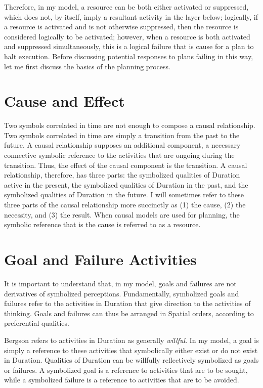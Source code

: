 Therefore, in my model, a resource can be both either activated or
suppressed, which does not, by itself, imply a resultant activity in
the layer below; logically, if a resource is activated and is not
otherwise suppressed, then the resource is considered logically to be
activated; however, when a resource is both activated and suppressed
simultaneously, this is a logical failure that is cause for a plan to
halt execution.  Before discussing potential responses to plans
failing in this way, let me first discuss the basics of the planning
process.

\section{Cause and Effect}

Two symbols correlated in time are not enough to compose a causal
relationship.  Two symbols correlated in time are simply a transition
from the past to the future.  A causal relationship supposes an
additional component, a necessary connective symbolic reference to the
activities that are ongoing during the transition.  Thus, the effect
of the causal component is the transition.  A causal relationship,
therefore, has three parts: the symbolized qualities of Duration
active in the present, the symbolized qualities of Duration in the
past, and the symbolized qualities of Duration in the future.  I will
sometimes refer to these three parts of the causal relationship more
succinctly as (1) the cause, (2) the necessity, and (3) the result.
When causal models are used for planning, the symbolic reference that
is the cause is referred to as a resource.

\section{Goal and Failure Activities}

It is important to understand that, in my model, goals and failures
are not derivatives of symbolized perceptions.  Fundamentally,
symbolized goals and failures refer to the activities in Duration that
give direction to the activities of thinking.  Goals and failures can
thus be arranged in Spatial orders, according to preferential
qualities.

Bergson refers to activities in Duration as generally \emph{willful}.
In my model, a goal is simply a reference to these activities that
symbolically either exist or do not exist in Duration.  Qualities of
Duration can be willfully reflectively symbolized as goals or
failures.  A symbolized goal is a reference to activities that are to
be sought, while a symbolized failure is a reference to activities
that are to be avoided.

